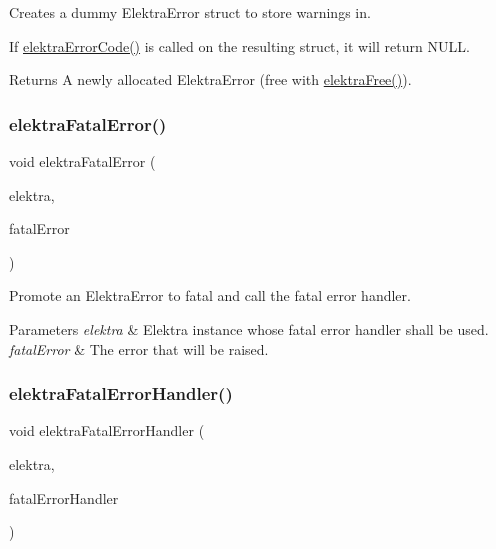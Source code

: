 Creates a dummy Elektra\+Error struct to store warnings in. 

If \mbox{\hyperlink{group__highlevel_ga22c0775760a9f42f29337c06bf8b2ab5}{elektra\+Error\+Code()}} is called on the resulting struct, it will return N\+U\+LL.

\begin{DoxyReturn}{Returns}
A newly allocated Elektra\+Error (free with \mbox{\hyperlink{internal_8c_a7f572149d2e0bfe18023a6ac969f195c}{elektra\+Free()}}). 
\end{DoxyReturn}
\mbox{\label{group__highlevel_ga57d87ff6defe4db402b772ab2a0025f9}} 
\subsubsection{\texorpdfstring{elektraFatalError()}{elektraFatalError()}}
{\footnotesize\ttfamily void elektra\+Fatal\+Error (\begin{DoxyParamCaption}\item[{Elektra $\ast$}]{elektra,  }\item[{Elektra\+Error $\ast$}]{fatal\+Error }\end{DoxyParamCaption})}



Promote an Elektra\+Error to fatal and call the fatal error handler. 


\begin{DoxyParams}{Parameters}
{\em elektra} & Elektra instance whose fatal error handler shall be used. \\
\hline
{\em fatal\+Error} & The error that will be raised. \\
\hline
\end{DoxyParams}
\mbox{\label{group__highlevel_ga496441e9e1dd80ed14a239dfc4c08c40}} 
\subsubsection{\texorpdfstring{elektraFatalErrorHandler()}{elektraFatalErrorHandler()}}
{\footnotesize\ttfamily void elektra\+Fatal\+Error\+Handler (\begin{DoxyParamCaption}\item[{Elektra $\ast$}]{elektra,  }\item[{Elektra\+Error\+Handler}]{fatal\+Error\+Handler }\end{DoxyParamCaption})}



